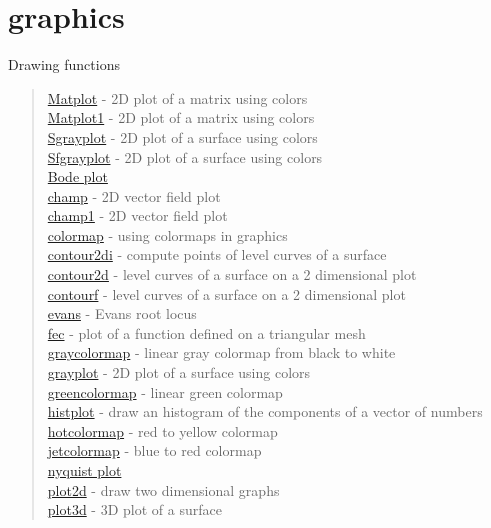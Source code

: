 \chapter*{graphics}

Drawing functions
\begin{quote}
\noindent
\hyperlink{Matplot}{Matplot} - 2D plot of a matrix using colors\\
\hyperlink{Matplot1}{Matplot1} - 2D plot of a matrix using colors \\
\hyperlink{Sgrayplot}{Sgrayplot} - 2D plot of a surface using colors \\
\hyperlink{Sfgrayplot}{Sfgrayplot} - 2D plot of a surface using colors \\
\hyperlink{bode}{Bode plot}\\
\hyperlink{champ}{champ} - 2D vector field plot \\
\hyperlink{champ1}{champ1} - 2D vector field plot \\
\hyperlink{colormap}{colormap} - using colormaps in graphics\\
\hyperlink{contour2di}{contour2di} - compute points of level curves of a surface\\
\hyperlink{contour2d}{contour2d} - level curves of a surface on a 2 dimensional plot\\
\hyperlink{contourf}{contourf}  - level curves of a surface on a 2 dimensional plot\\
\hyperlink{evans}{evans} - Evans root locus\\
\hyperlink{fec}{fec} -  plot of a function defined on a triangular mesh\\
\hyperlink{graycolormap}{graycolormap} - linear gray colormap from black to white\\
\hyperlink{grayplot}{grayplot} - 2D plot of a surface using colors \\
\hyperlink{greencolormap}{greencolormap} - linear green colormap\\
\hyperlink{histplot}{histplot} - draw an histogram of the components of a vector of numbers\\
\hyperlink{hotcolormap}{hotcolormap} - red to yellow colormap\\
\hyperlink{jetcolormap}{jetcolormap} - blue to red colormap \\
\hyperlink{nyquist}{nyquist plot}\\
\hyperlink{plot2d}{plot2d} - draw two dimensional graphs\\
\hyperlink{plot3d}{plot3d} - 3D plot of a surface \\

\end{quote}
